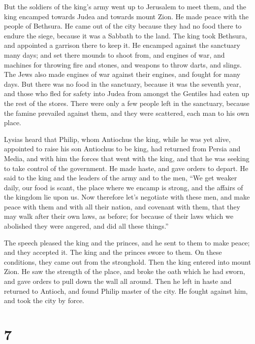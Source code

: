  But the soldiers of the king's army went up to Jerusalem
to meet them, and the king encamped towards Judea and towards mount
Zion.  He made peace with the people of Bethsura. He came
out of the city because they had no food there to endure the siege,
because it was a Sabbath to the land.  The king took
Bethsura, and appointed a garrison there to keep it.  He
encamped against the sanctuary many days; and set there mounds to shoot
from, and engines of war, and machines for throwing fire and stones, and
weapons to throw darts, and slings.  The Jews also made
engines of war against their engines, and fought for many days.
 But there was no food in the sanctuary, because it was the
seventh year, and those who fled for safety into Judea from amongst the
Gentiles had eaten up the rest of the stores.  There were
only a few people left in the sanctuary, because the famine prevailed
against them, and they were scattered, each man to his own place.

 Lysias heard that Philip, whom Antiochus the king, while
he was yet alive, appointed to raise his son Antiochus to be king,
 had returned from Persia and Media, and with him the
forces that went with the king, and that he was seeking to take control
of the government.  He made haste, and gave orders to
depart. He said to the king and the leaders of the army and to the men,
``We get weaker daily, our food is scant, the place where we encamp is
strong, and the affairs of the kingdom lie upon us.  Now
therefore let's negotiate with these men, and make peace with them and
with all their nation,  and covenant with them, that they
may walk after their own laws, as before; for because of their laws
which we abolished they were angered, and did all these things.''

 The speech pleased the king and the princes, and he sent
to them to make peace; and they accepted it.  The king and
the princes swore to them. On these conditions, they came out from the
stronghold.  Then the king entered into mount Zion. He saw
the strength of the place, and broke the oath which he had sworn, and
gave orders to pull down the wall all around.  Then he left
in haste and returned to Antioch, and found Philip master of the city.
He fought against him, and took the city by force.

\hypertarget{section-6}{%
\section{7}\label{section-6}}

